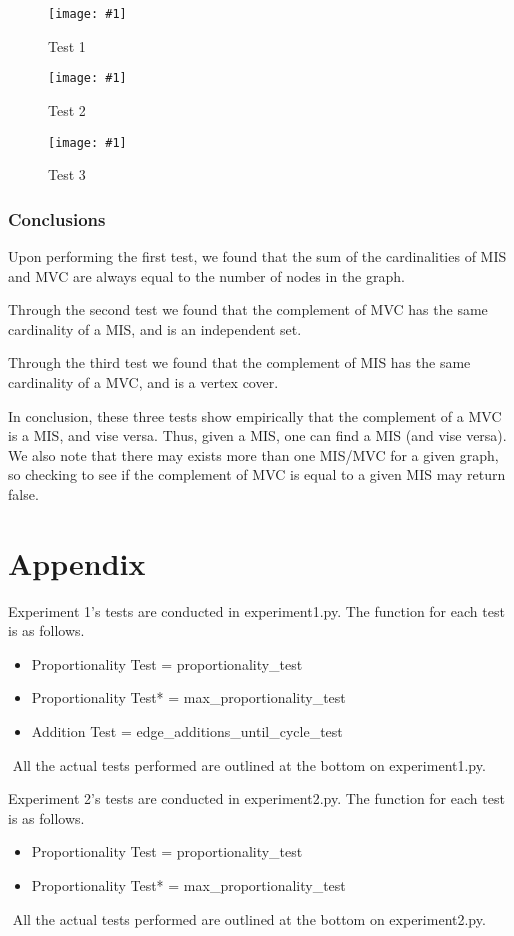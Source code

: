 \documentclass[12pt]{article}
\newcommand{\firgureBuffered}[2]
{
    \begin{figure}[ht!]
        \centering
        \texttt{[image: \#1]}
        \caption{#2}
    \end{figure}
}
\begin{document}
\FloatBarrier{}
\firgureBuffered{images/IndSet/Figure_1.png}{Test 1}
\firgureBuffered{images/IndSet/Figure_2.png}{Test 2}
\firgureBuffered{images/IndSet/Figure_3.png}{Test 3}
\FloatBarrier{}

\subsubsection{Conclusions}
Upon performing the first test, we found that the sum of the cardinalities of MIS and MVC are always equal
to the number of nodes in the graph. 

Through the second test we found that the complement of MVC has the same cardinality of a MIS, and is an independent set.

Through the third test we found that the complement of MIS has the same cardinality of a MVC, and is a vertex cover.

In conclusion, these three tests show empirically that the complement of a MVC is a MIS, and vise versa. Thus, given a MIS, 
one can find a MIS (and vise versa). We also note that there may exists more than one MIS/MVC for a given graph, so checking 
to see if the complement of MVC is equal to a given MIS may return false. 



%
%
%
%
\newpage
\section{Appendix}

Experiment 1's tests are conducted in experiment1.py.
The function for each test is as follows.
\begin{itemize}
    \item Proportionality Test = proportionality\_test\(\)
    \item Proportionality Test* = max\_proportionality\_test\(\)
    \item Addition Test = edge\_additions\_until\_cycle\_test\(\)
\end{itemize}
$ $
\newline
All the actual tests performed are outlined at the bottom on experiment1.py.
\newline
$ $
\newline

Experiment 2's tests are conducted in experiment2.py.
The function for each test is as follows.
\begin{itemize}
    \item Proportionality Test = proportionality\_test\(\)
    \item Proportionality Test* = max\_proportionality\_test\(\)
\end{itemize}
$ $
\newline
All the actual tests performed are outlined at the bottom on experiment2.py.
\\
\\
\end{document}
